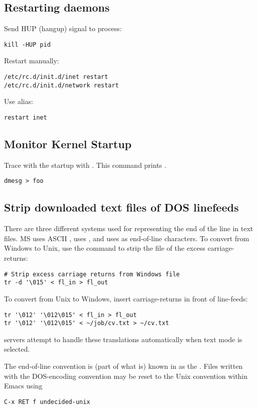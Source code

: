 \documentclass[12pt,twoside]{article}
\begin{document}
\subsection{Restarting daemons}\label{sxn:dmn2}
Send HUP (hangup) signal to process:
\begin{verbatim}
kill -HUP pid
\end{verbatim}
Restart  manually:
\begin{verbatim}
/etc/rc.d/init.d/inet restart
/etc/rc.d/init.d/network restart
\end{verbatim}
Use alias:
\begin{verbatim}
restart inet
\end{verbatim}

\subsection{Monitor Kernel Startup}\label{sxn:krn2}
Trace with the  startup with .
This command prints .
\begin{verbatim}
dmesg > foo
\end{verbatim}

\subsection{Strip downloaded text files of DOS linefeeds}\label{sxn:dos}
There are three different systems used for representing the end of 
the line in text files. 
MS  uses ASCII ,  uses 
, and  uses  as end-of-line
characters.  
To convert from Windows to Unix, use the  command to strip
the file of the excess carriage-returns:
\begin{verbatim}
# Strip excess carriage returns from Windows file
tr -d '\015' < fl_in > fl_out
\end{verbatim}
To convert from Unix to Windows, insert carriage-returns in front of
line-feeds:
\begin{verbatim}
tr '\012' '\012\015' < fl_in > fl_out
tr '\012' '\012\015' < ~/job/cv.txt > ~/cv.txt
\end{verbatim}
 servers attempt to handle these translations
automatically when text mode is selected.

The end-of-line convention is (part of what is) known in
  as the .
Files written with the DOS-encoding convention may be reset to the
Unix convention within Emacs using
\begin{verbatim}
C-x RET f undecided-unix
\end{verbatim}
\end{document}
